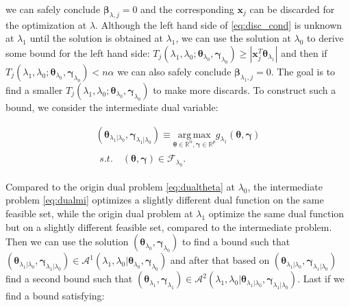 we can safely conclude $\boldsymbol\beta_{\lambda,j}=0$ and the corresponding $\boldsymbol x_j$ can be discarded for the optimization at $\lambda$. Although the left hand side of \eqref{eq:disc_cond} is unknown at $\lambda_1$ until the solution is obtained at $\lambda_1$, we can use the solution at $\lambda_{0}$ to derive some bound for the left hand side: $T_j(\lambda_{1},\lambda_{0};\boldsymbol\theta_{\lambda_0},\boldsymbol\gamma_{\lambda_0})\geq |\boldsymbol x_j^T\boldsymbol\theta_{\lambda_1}|$ and then if $T_j(\lambda_{1},\lambda_{0};\boldsymbol\theta_{\lambda_0},\boldsymbol\gamma_{\lambda_0})<n\alpha$ we can also safely conclude $\boldsymbol\beta_{\lambda_1,j}=0$. The goal is to find a smaller $T_j(\lambda_{1},\lambda_{0};\boldsymbol\theta_{\lambda_0},\boldsymbol\gamma_{\lambda_0})$ to make more discards. To construct such a bound, we consider the intermediate dual variable:

\begin{gather}
        \label{eq:dualmi}
        (\boldsymbol\theta_{\lambda_1|\lambda_0},\boldsymbol\gamma_{\lambda_1|\lambda_0})\equiv\underset{\boldsymbol\theta\in \mathbb{R}^{ n},\boldsymbol\gamma\in\mathbb{R}^p}{\mathrm{arg\,max}}g_{\lambda_1}(\boldsymbol\theta,\boldsymbol\gamma)\\
        \begin{aligned}s.t.\quad (\boldsymbol\theta,\boldsymbol\gamma)\in \mathcal{F}_{\lambda_0}\nonumber.
        \end{aligned}
\end{gather}

Compared to the origin dual problem \eqref{eq:dualtheta} at $\lambda_0$, the intermediate problem \eqref{eq:dualmi} optimizes a slightly different dual function on the same feasible set, while the origin dual problem at $\lambda_1$ optimize the same dual function but on a slightly different feasible set, compared to the intermediate problem. Then we can use the solution $(\boldsymbol\theta_{\lambda_0},\boldsymbol\gamma_{\lambda_0})$ to find a bound such that $(\boldsymbol\theta_{\lambda_1|\lambda_0},\boldsymbol\gamma_{\lambda_1|\lambda_0})\in \mathcal{A}^1(\lambda_1,\lambda_0|\boldsymbol\theta_{\lambda_0},\boldsymbol\gamma_{\lambda_0})$ and after that based on $(\boldsymbol\theta_{\lambda_1|\lambda_0},\boldsymbol\gamma_{\lambda_1|\lambda_0})$ find a second bound such that $(\boldsymbol\theta_{\lambda_1},\boldsymbol\gamma_{\lambda_1})\in \mathcal{A}^2(\lambda_1,\lambda_0|\boldsymbol\theta_{\lambda_1|\lambda_0},\boldsymbol\gamma_{\lambda_1|\lambda_0})$. Last if we find a bound satisfying:

